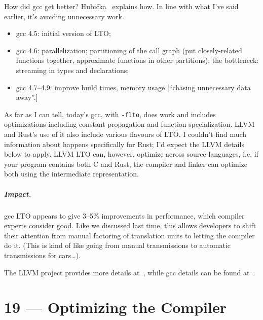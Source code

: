 \documentclass[a4paper]{report}
\begin{document}
How did gcc get better?
Hubi\v{c}ka~\cite{hubicka15:_link_gcc} explains how. In line with what I've said earlier, it's
avoiding unnecessary work.
\begin{itemize}[noitemsep]
\item gcc 4.5: initial version of LTO;
\item gcc 4.6: parallelization; partitioning of the call graph (put closely-related functions together, approximate functions in other partitions); the bottleneck: streaming in types and declarations;
\item gcc 4.7--4.9: improve build times, memory usage [``chasing unnecessary data away''.]
\end{itemize}
As far as I can tell, today's gcc, with {\tt -flto}, does work and includes
optimizations including constant propagation and function
specialization. LLVM and Rust's use of it also include various flavours of LTO.
I couldn't find much information about happens specifically for Rust; I'd expect the
LLVM details below to apply. LLVM LTO can, however,
optimize across source languages, i.e. if your program contains both C and Rust,
the compiler and linker can optimize both using the intermediate representation.

\paragraph{Impact.} gcc LTO appears to give 3--5\% improvements in performance, which compiler experts consider good.
Like we discussed last time, this allows developers to shift their attention from 
manual factoring of translation units to letting the compiler do it. (This is kind of like going
from manual transmissions to automatic transmissions for cars\ldots).

The LLVM project provides more details at~\cite{project17:_llvm_link_time_optim}, while gcc details
can be found at~\cite{novillo09:_linkt}.










\chapter*{19 --- Optimizing the Compiler}

\end{document}
